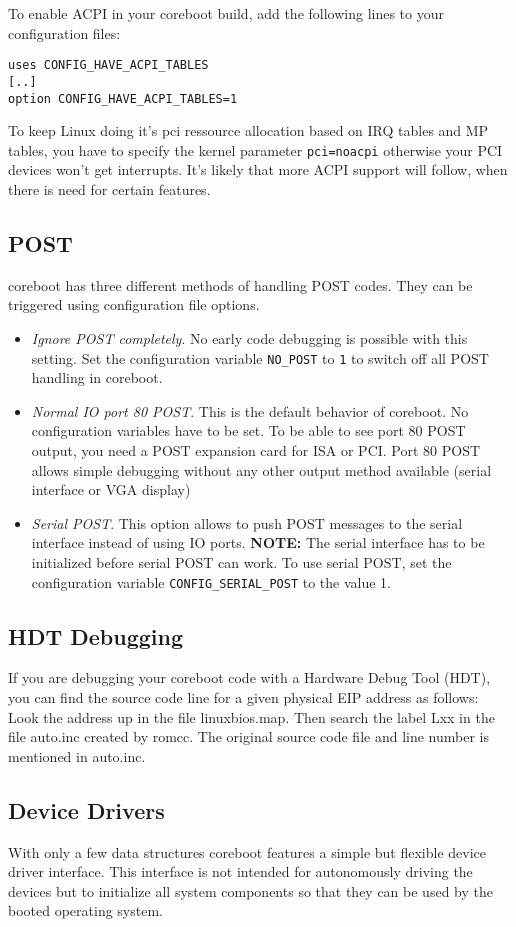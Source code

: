 \documentclass[titlepage,12pt]{article}
\begin{document}
To enable ACPI in your coreboot build, add the following lines to your
configuration files:
\begin{verbatim}
uses CONFIG_HAVE_ACPI_TABLES
[..]
option CONFIG_HAVE_ACPI_TABLES=1
\end{verbatim}

To keep Linux doing it's pci ressource allocation based on IRQ tables and MP
tables, you have to specify the kernel parameter \texttt{pci=noacpi} otherwise
your PCI devices won't get interrupts.
It's likely that more ACPI support will follow, when there is need for certain
features.

\subsection{POST}
coreboot has three different methods of handling POST codes. They can
be triggered using configuration file options.
\begin{itemize}
\item
\emph{Ignore POST completely}. No early code debugging is possible with
this setting.  Set the configuration variable \texttt{NO\_POST} to
\texttt{1} to switch off all POST handling in coreboot.
\item
\emph{Normal IO port 80 POST}. This is the default behavior of
coreboot. No configuration variables have to be set. To be able to see
port 80 POST output, you need a POST expansion card for ISA or PCI. Port
80 POST allows simple debugging without any other output method
available (serial interface or VGA display)
\item
\emph{Serial POST}.
This option allows to push POST messages to the serial interface instead
of using IO ports. \textbf{NOTE:} The serial interface has to be
initialized before serial POST can work. To use serial POST, set the
configuration variable \texttt{CONFIG\_SERIAL\_POST} to the value 1.
\end{itemize}


\subsection{HDT Debugging}
If you are debugging your coreboot code with a Hardware Debug Tool
(HDT), you can find the source code line for a given physical EIP
address as follows: Look the address up in the file linuxbios.map. Then
search the label Lxx in the file auto.inc created by romcc. The original
source code file and line number is mentioned in auto.inc.


\subsection{Device Drivers}
With only a few data structures coreboot features a simple but flexible
device driver interface. This interface is not intended for autonomously
driving the devices but to initialize all system components so that they
can be used by the booted operating system.
\end{document}
